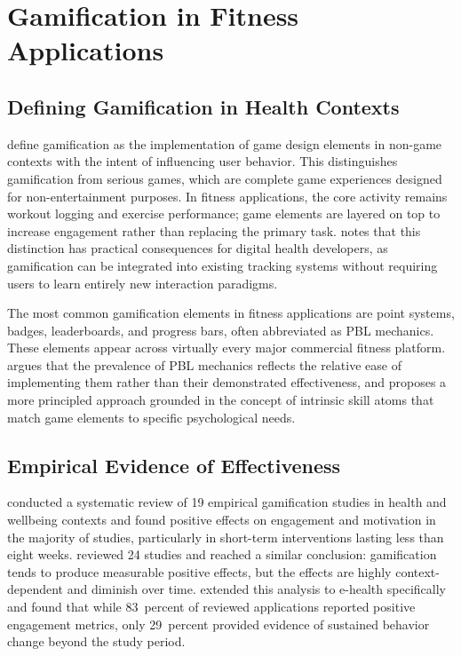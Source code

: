 \documentclass[12pt, a4paper]{report}
\begin{document}
\section{Gamification in Fitness Applications}

\subsection{Defining Gamification in Health Contexts}

\citet{hamari2014} define gamification as the implementation of game design elements in non-game contexts with the intent of influencing user behavior. This distinguishes gamification from serious games, which are complete game experiences designed for non-entertainment purposes. In fitness applications, the core activity remains workout logging and exercise performance; game elements are layered on top to increase engagement rather than replacing the primary task. \citet{cugelman2013} notes that this distinction has practical consequences for digital health developers, as gamification can be integrated into existing tracking systems without requiring users to learn entirely new interaction paradigms.

The most common gamification elements in fitness applications are point systems, badges, leaderboards, and progress bars, often abbreviated as PBL mechanics. These elements appear across virtually every major commercial fitness platform. \citet{deterding2015} argues that the prevalence of PBL mechanics reflects the relative ease of implementing them rather than their demonstrated effectiveness, and proposes a more principled approach grounded in the concept of intrinsic skill atoms that match game elements to specific psychological needs.

\subsection{Empirical Evidence of Effectiveness}

\citet{johnson2016} conducted a systematic review of 19 empirical gamification studies in health and wellbeing contexts and found positive effects on engagement and motivation in the majority of studies, particularly in short-term interventions lasting less than eight weeks. \citet{hamari2014} reviewed 24 studies and reached a similar conclusion: gamification tends to produce measurable positive effects, but the effects are highly context-dependent and diminish over time. \citet{sardi2017} extended this analysis to e-health specifically and found that while 83~percent of reviewed applications reported positive engagement metrics, only 29~percent provided evidence of sustained behavior change beyond the study period.
\end{document}
